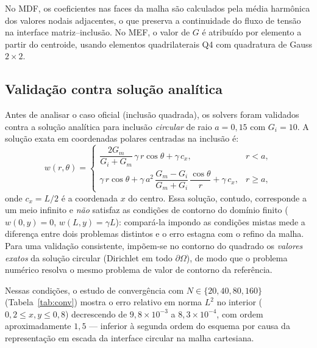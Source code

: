 \documentclass[brazil]{TCAM} %
\begin{document}
No MDF, os coeficientes nas faces da malha são calculados pela média harmônica dos
valores nodais adjacentes, o que preserva a continuidade do fluxo de tensão na
interface matriz--inclusão. No MEF, o valor de $G$ é atribuído por elemento a partir
do centroide, usando elementos quadrilaterais Q4 com quadratura de Gauss $2{\times}2$.

\subsection{Validação contra solução analítica}

Antes de analisar o caso oficial (inclusão quadrada), os solvers foram validados
contra a solução analítica para inclusão \emph{circular} de raio $a = 0{,}15$
com $G_i = 10$. A solução exata em coordenadas polares centradas na inclusão é:
\begin{equation*}
    w(r,\theta) =
    \begin{cases}
        \dfrac{2G_m}{G_i+G_m}\,\gamma\,r\cos\theta + \gamma\,c_x,
        & r < a, \\[4pt]
        \gamma\,r\cos\theta
        + \gamma\,a^2\,\dfrac{G_m-G_i}{G_m+G_i}\,\dfrac{\cos\theta}{r}
        + \gamma\,c_x,
        & r \ge a,
    \end{cases}
\end{equation*}
onde $c_x = L/2$ é a coordenada $x$ do centro. Essa solução, contudo, corresponde a
um meio infinito e \emph{não} satisfaz as condições de contorno do domínio finito
($w(0,y)=0$, $w(L,y)=\gamma L$): compará-la impondo as condições mistas mede a
diferença entre dois problemas distintos e o erro estagna com o refino da malha.
Para uma validação consistente, impõem-se no contorno do quadrado os \emph{valores
exatos} da solução circular (Dirichlet em todo $\partial\Omega$), de modo que o
problema numérico resolva o mesmo problema de valor de contorno da referência.

Nessas condições, o estudo de convergência com $N \in \{20, 40, 80, 160\}$
(Tabela~\ref{tab:conv}) mostra o erro relativo em norma $L^2$ no interior
($0{,}2 \le x,y \le 0{,}8$) decrescendo de $9{,}8\times10^{-3}$ a
$8{,}3\times10^{-4}$, com ordem aproximadamente $1{,}5$ --- inferior à segunda ordem
do esquema por causa da representação em escada da interface circular na malha
cartesiana.
\end{document}
